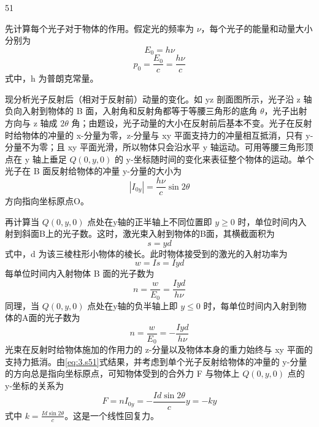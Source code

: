 \begin{solution}{51}
\begin{subsolution}
\begin{subsubsolution}
先计算每个光子对于物体的作用。假定光的频率为 $\nu$，每个光子的能量和动量大小分别为
\begin{equation}
E_{0} = h\nu
\label{eq:1.s51}
\end{equation}
\begin{equation}
p_{0} = \frac{E_{0}}{c} = \frac{h\nu}{c}
\label{eq:2.s51}
\end{equation}
式中，h 为普朗克常量。

现分析光子反射后（相对于反射前）动量的变化。如 yz 剖面图所示，光子沿 z 轴负向入射到物体的 B 面，入射角和反射角都等于等腰三角形的底角 $\theta$，光子出射方向与 z 轴成 $2\theta$ 角；由题设，光子动量的大小在反射前后基本不变。光子在反射时给物体的冲量的 x-分量为零，z-分量与 xy 平面支持力的冲量相互抵消，只有 y-分量不为零；且 xy 平面光滑，所以物体只会沿水平 y 轴运动。可用等腰三角形顶点在 y 轴上垂足 $Q(0,y,0)$ 的 y-坐标随时间的变化来表征整个物体的运动。单个光子在 B 面反射给物体的冲量 y-分量的大小为
\begin{equation}
|I_{0y}| = \frac{h\nu}{c}\sin 2\theta
\label{eq:3.s51}
\end{equation}
方向指向坐标原点O。

再计算当 $Q(0,y,0)$ 点处在y轴的正半轴上不同位置即 $y\geq0$ 时，单位时间内入射到斜面B上的光子数。这时，激光束入射到物体的B面，其横截面积为
\begin{equation}
s = yd
\label{eq:4.s51}
\end{equation}
式中，d 为该三棱柱形小物体的棱长。此时物体接受到的激光的入射功率为
\begin{equation}
w = Is = Iyd
\label{eq:5.s51}
\end{equation}
每单位时间内入射物体 B 面的光子数为
\begin{equation}
n = \frac{w}{E_{0}} = \frac{Iyd}{h\nu}
\label{eq:6.s51}
\end{equation}
同理，当 $Q(0,y,0)$ 点处在y轴的负半轴上即 $y\leq0$ 时，每单位时间内入射到物体的A面的光子数为
\begin{equation}
n = \frac{w}{E_{0}} = -\frac{Iyd}{h\nu}
\label{eq:7.s51}
\end{equation}
光束在反射时给物体施加的作用力的 z-分量以及物体本身的重力始终与 xy 平面的支持力抵消。由\eqref{eq:3.s51}式结果，并考虑到单个光子反射给物体的冲量的 y-分量的方向总是指向坐标原点，可知物体受到的合外力 F 与物体上 $Q(0,y,0)$ 点的 y-坐标的关系为
\begin{equation}
F = nI_{0y} = -\frac{Id\sin 2\theta}{c} y = -ky
\label{eq:8.s51}
\end{equation}
式中 $k = \frac{Id\sin 2\theta}{c}$。这是一个线性回复力。


\end{subsubsolution}
\end{subsolution}
\end{solution}
